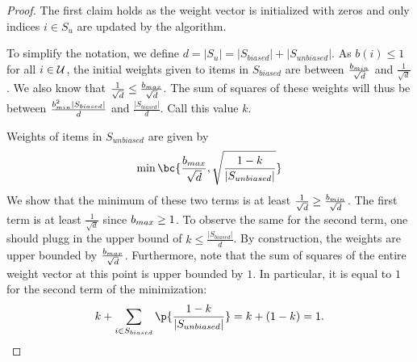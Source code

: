 \begin{proof}
The first claim holds as the weight vector is initialized with zeros and only indices $i \in S_u$ are updated by the algorithm.

To simplify the notation, we define $d = |S_u| = |S_{biased}| + |S_{unbiased}|$.
As $b(i) \leq 1$ for all $i \in \mathcal{U}$, the initial weights given to items in $S_{biased}$ are between $\frac{b_{min}}{\sqrt{d}}$ and $\frac{1}{\sqrt{d}}$. We also know that $\frac{1}{\sqrt{d}} \leq \frac{b_{max}}{\sqrt{d}}$.
The sum of squares of these weights will thus be between $\frac{b_{min}^2 |S_{biased}|}{d}$ and $\frac{|S_{biased}|}{d}$.
Call this value $k$.

Weights of items in $S_{unbiased}$ are given by
\begin{equation*}
    \min\bc{\frac{\bmax}{\sqrt{d}}, \sqrt{\frac{1 - k}{|S_{unbiased}|}}}
\end{equation*}
We show that the minimum of these two terms is at least $\frac{1}{\sqrt{d}} \geq \frac{b_{min}}{\sqrt{d}}$. The first term is at least $\frac{1}{\sqrt{d}}$ since $b_{max} \geq 1$. To observe the same for the second term, one should   plugg in the upper bound of $k \leq \frac{|S_{biased}|}{d}$. 
By construction, the weights are upper bounded by $\frac{b_{max}}{\sqrt{d}}$.
Furthermore, note that the sum of squares of the entire weight vector at this point is upper bounded by $1$. In particular, it is equal to $1$ for the second term of the minimization:
\begin{equation*}
    k + \sum_{i \in S_{biased}} \p{\frac{1 - k}{|S_{unbiased}|}}
    = k + (1 - k)
    = 1.
\end{equation*}


\end{proof}
